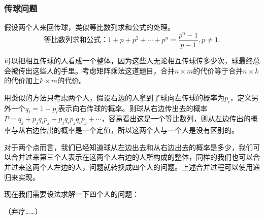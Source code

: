 \subsubsection{传球问题}
假设两个人来回传球，类似等比数列求和公式的处理。
\begin{equation*}
    等比数列求和公式：1+p+p^2+\cdots+p^n=\frac{p^n-1}{p-1},p\neq 1.
\end{equation*}

可以把相互传球的人看成一个整体，因为这些人无论相互传球传多少次，球最终总会被传出这些人的手里。考虑矩阵乘法这道题目，合并$n\times m$的代价等于合并$n\times k$的代价加上$k\times m$的代价。

用类似的方法只考虑两个人，假设右边的人拿到了球向左传球的概率为$p_i$，定义另外一个$q_i=1-p_i$表示向右传球的概率。则球从右边传出去的概率$P=q_j+p_jq_ip_j+p_jq_ip_jq_ip_j+\cdots$，容易看出这是一个等比数列，则从左边传出的概率与从右边传出的概率是一个定值，所以这两个人与一个人是没有区别的。

对于两个点而言，我们已经知道球从左边出去和从右边出去的概率是多少，我们可以合并过来第三个人表示在这两个人右边的人所构成的整体，同样的我们也可以合并过来这两个人左边的人，问题就转换成四个人的问题。上述合并过程可以使用递归来实现。

现在我们需要设法求解一下四个人的问题：

（弃疗……）
